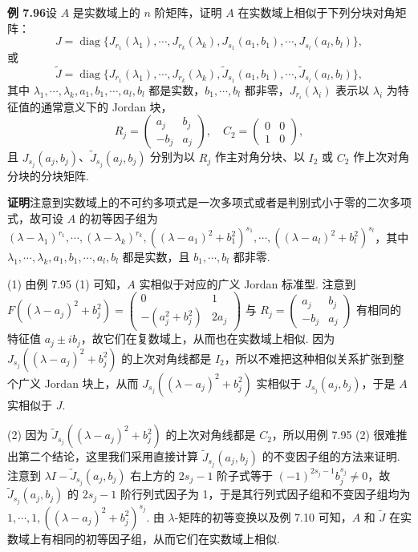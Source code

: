 \documentclass[UTF8,12pt,a4paper,fontset=fandol]{ctexart}
\begin{document}
\noindent\textbf{例 7.96}\quad 设 $A$ 是实数域上的 $n$ 阶矩阵，证明 $A$ 在实数域上相似于下列分块对角矩阵：
\[
J=\operatorname{diag}\{J_{r_1}(\lambda_1),\cdots,J_{r_k}(\lambda_k),J_{s_1}(a_1,b_1),\cdots,J_{s_l}(a_l,b_l)\},
\]
或
\[
\widetilde J=\operatorname{diag}\{J_{r_1}(\lambda_1),\cdots,J_{r_k}(\lambda_k),\widetilde J_{s_1}(a_1,b_1),\cdots,\widetilde J_{s_l}(a_l,b_l)\},
\]
其中 $\lambda_1,\cdots,\lambda_k,a_1,b_1,\cdots,a_l,b_l$ 都是实数，$b_1,\cdots,b_l$ 都非零，$J_{r_i}(\lambda_i)$ 表示以 $\lambda_i$ 为特征值的通常意义下的 Jordan 块，
\[
R_j=\left(\begin{array}{rr}a_j&b_j\\-b_j&a_j\end{array}\right),\quad C_2=\left(\begin{array}{cc}0&0\\1&0\end{array}\right),
\]
且 $J_{s_j}(a_j,b_j)$、$\widetilde J_{s_j}(a_j,b_j)$ 分别为以 $R_j$ 作主对角分块、以 $I_2$ 或 $C_2$ 作上次对角分块的分块矩阵.

\noindent\textbf{证明}\quad 注意到实数域上的不可约多项式是一次多项式或者是判别式小于零的二次多项式，故可设 $A$ 的初等因子组为 $(\lambda-\lambda_1)^{r_1},\cdots,(\lambda-\lambda_k)^{r_k},((\lambda-a_1)^2+b_1^2)^{s_1},\cdots,((\lambda-a_l)^2+b_l^2)^{s_l}$，其中 $\lambda_1,\cdots,\lambda_k,a_1,b_1,\cdots,a_l,b_l$ 都是实数，且 $b_1,\cdots,b_l$ 都非零.

(1) 由例 7.95 (1) 可知，$A$ 实相似于对应的广义 Jordan 标准型. 注意到 $F((\lambda-a_j)^2+b_j^2)=\left(\begin{array}{cc}0&1\\-(a_j^2+b_j^2)&2a_j\end{array}\right)$ 与 $R_j=\left(\begin{array}{rr}a_j&b_j\\-b_j&a_j\end{array}\right)$ 有相同的特征值 $a_j\pm ib_j$，故它们在复数域上，从而也在实数域上相似. 因为 $J_{s_j}((\lambda-a_j)^2+b_j^2)$ 的上次对角线都是 $I_2$，所以不难把这种相似关系扩张到整个广义 Jordan 块上，从而 $J_{s_j}((\lambda-a_j)^2+b_j^2)$ 实相似于 $J_{s_j}(a_j,b_j)$，于是 $A$ 实相似于 $J$.

(2) 因为 $\widetilde J_{s_j}((\lambda-a_j)^2+b_j^2)$ 的上次对角线都是 $C_2$，所以用例 7.95 (2) 很难推出第二个结论，这里我们采用直接计算 $\widetilde J_{s_j}(a_j,b_j)$ 的不变因子组的方法来证明. 注意到 $\lambda I-\widetilde J_{s_j}(a_j,b_j)$ 右上方的 $2s_j-1$ 阶子式等于 $(-1)^{2s_j-1}b_j^{s_j}\ne0$，故 $\widetilde J_{s_j}(a_j,b_j)$ 的 $2s_j-1$ 阶行列式因子为 1，于是其行列式因子组和不变因子组均为 $1,\cdots,1,((\lambda-a_j)^2+b_j^2)^{s_j}$. 由 $\lambda$-矩阵的初等变换以及例 7.10 可知，$A$ 和 $\widetilde J$ 在实数域上有相同的初等因子组，从而它们在实数域上相似.
\end{document}
